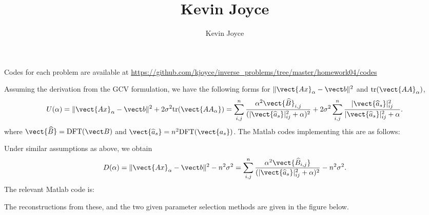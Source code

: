 \documentclass{homework}
\title{Kevin Joyce}
\author{Kevin Joyce}
\begin{document}
 
\newcommand{\figref}[1]{\figurename~\ref{#1}}
\renewcommand{\bar}{\overline}
\renewcommand{\hat}{\widehat}
\renewcommand{\SS}{\mathcal S}
\newcommand{\HH}{\mathscr H}
\newcommand{\mom}{\widetilde}
\newcommand{\mle}{\widehat \Uptheta}
\newcommand{\eps}{\varepsilon}
\newcommand{\todist}{\stackrel{D}\longrightarrow}
\newcommand{\toprob}{\stackrel{p}\longrightarrow}
\newcommand{\TTheta}{\overline{\underline \Theta} }
\newcommand{\del}{\partial}
\newcommand{\approxsim}{\overset{\cdotp}{\underset{\cdotp}{\sim}}}

Codes for each problem are available at \url{https://github.com/kjoyce/inverse_problems/tree/master/homework04/codes}

\begin{longproblem}


  Assuming the derivation from the GCV formulation, we have the following forms for $\|\vect{Ax}_\alpha - \vect b\|^2$ and $\mathrm{tr}(\vect{AA}_\alpha)$,
  $$
    U(\alpha) = \|\vect{Ax}_\alpha - \vect b\|^2 + 2\sigma^2 \mathrm{tr}(\vect{AA_{\alpha}}) = \sum_{i,j}^n \frac{\alpha^2 \vect{\hat B}_{i,j}}{(|\vect{\hat a_s} |^2_{ij} + \alpha)^2}  + 2\sigma^2 \sum_{i,j}^n \frac{|\vect{\hat a_s} |^2_{ij}}{|\vect{\hat a_s} |^2_{ij} + \alpha}.
  $$
  where $\vect{\hat B} = \mathrm{DFT}( \vect B )$ and $\vect{\hat a_s} = n^2 \mathrm{DFT}( \vect{a_s} )$.  The Matlab codes implementing this are as follows:
  

  Under similar assumptions as above, we obtain
  $$
    D(\alpha) = \|\vect{Ax}_\alpha - \vect b\|^2 - n^2\sigma^2 = \sum_{i,j}^n \frac{\alpha^2 \vect{\hat B_{i,j}}}{(|\vect{\hat a_s} |^2_{ij} + \alpha)^2} - n^2 \sigma^2.
  $$
  The relevant Matlab code is:

  

The reconstructions from these, and the two given parameter selection methods are given in the figure below.


\end{longproblem}
\end{document}
